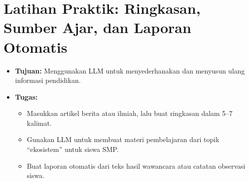 \section*{Latihan Praktik: Ringkasan, Sumber Ajar, dan Laporan Otomatis}
\begin{itemize}
	\item \textbf{Tujuan:} Menggunakan LLM untuk menyederhanakan dan menyusun ulang informasi pendidikan.
	\item \textbf{Tugas:}
	\begin{itemize}
		\item Masukkan artikel berita atau ilmiah, lalu buat ringkasan dalam 5–7 kalimat.
		\item Gunakan LLM untuk membuat materi pembelajaran dari topik “ekosistem” untuk siswa SMP.
		\item Buat laporan otomatis dari teks hasil wawancara atau catatan observasi siswa.
	\end{itemize}
\end{itemize}
